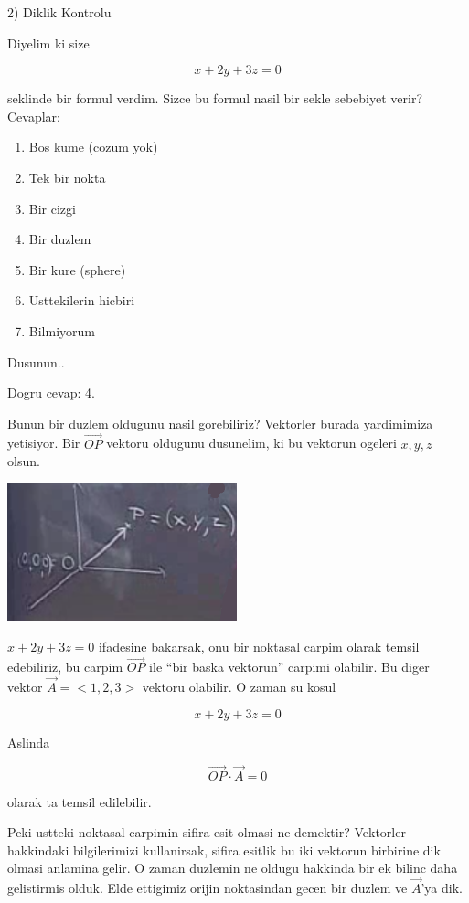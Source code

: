 \documentclass[12pt,fleqn]{article}\usepackage{../common}
\begin{document}
2) Diklik Kontrolu

Diyelim ki size 

\[ x + 2y + 3z = 0 \]

seklinde bir formul verdim. Sizce bu formul nasil bir sekle sebebiyet
verir? Cevaplar:

\begin{enumerate}
   \item Bos kume (cozum yok)
   \item Tek bir nokta
   \item Bir cizgi
   \item Bir duzlem
   \item Bir kure (sphere)
   \item Usttekilerin hicbiri
   \item Bilmiyorum
\end{enumerate}

Dusunun.. 

Dogru cevap: 4. 

Bunun bir duzlem oldugunu nasil gorebiliriz? Vektorler burada yardimimiza
yetisiyor. Bir $\vec{OP}$ vektoru oldugunu dusunelim, ki bu vektorun
ogeleri $x,y,z$ olsun. 

\includegraphics[height=4cm]{1_14.png}

$x + 2y + 3z = 0$ ifadesine bakarsak, onu bir noktasal carpim olarak temsil
edebiliriz, bu carpim $\vec{OP}$ ile ``bir baska vektorun'' carpimi
olabilir. Bu diger vektor $\vec{A} = <1,2,3>$ vektoru olabilir. O zaman su kosul

\[ x + 2y + 3z = 0 \]

Aslinda

\[ \vec{OP} \cdot \vec{A} = 0 \]

olarak ta temsil edilebilir.

Peki ustteki noktasal carpimin sifira esit olmasi ne demektir? Vektorler
hakkindaki bilgilerimizi kullanirsak, sifira esitlik bu iki vektorun
birbirine dik olmasi anlamina gelir. O zaman duzlemin ne oldugu hakkinda
bir ek bilinc daha gelistirmis olduk. Elde ettigimiz orijin noktasindan
gecen bir duzlem ve $\vec{A}$'ya dik. 
\end{document}

